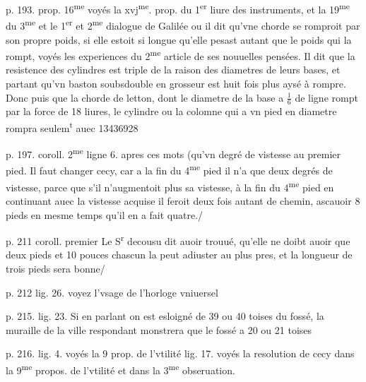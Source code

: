 \documentclass[11pt,a4paper]{article}
\begin{document}
p. 193. prop. 16\textsuperscript{me}
voyés la xvj\textsuperscript{me}. prop. du 1\textsuperscript{er} liure des instruments, et la 19\textsuperscript{me} du 3\textsuperscript{me} et le 1\textsuperscript{er} et 2\textsuperscript{me} dialogue de Galilée ou il dit qu'vne chorde se romproit par son propre poids, si elle estoit si longue qu'elle pesast autant que le poids qui la rompt, voyés les experiences du 2\textsuperscript{me} article de ses nouuelles pensées. Il dit que la resistence des cylindres est triple de la raison des diametres de leurs bases, et partant qu'vn baston soubsdouble en grosseur est huit fois plus aysé à rompre. Donc puis que la chorde de letton, dont le diametre de la base a $\frac{1}{6}$ de ligne rompt par la force de 18 liures, le cylindre ou la colomne qui a \struck{\ill{}} vn pied en diametre rompra seulem\textsuperscript{t} auec 13436928

p. 197. coroll. 2\textsuperscript{me} ligne 6. apres ces mots (qu'vn degré de vistesse au premier pied.
Il faut changer cecy, car a la fin du 4\textsuperscript{me} pied il n'a que deux degrés de vistesse, parce que s'il n'augmentoit plus sa vistesse, à la fin du 4\textsuperscript{me} pied en continuant auec la vistesse acquise il feroit deux fois autant de chemin, ascauoir 8 pieds en mesme temps qu'il en a fait quatre./

p. 211 coroll. premier
Le S\textsuperscript{r} decousu dit auoir trouué, qu'elle ne doibt auoir que deux pieds et 10 pouces chascun la peut adiuster au plus pres, et la longueur de trois pieds sera bonne/


p. 212 lig. 26.
voyez l'vsage de l'horloge vniuersel

p. 215. lig. 23.
Si en parlant on est esloigné de 39 ou 40 toises du fossé, la muraille de la ville respondant monstrera que le fossé a 20 ou 21 toises

p. 216. lig. 4.
voyés la 9 prop. de l'vtilité
 lig. 17. 
voyés la resolution de cecy dans la 9\textsuperscript{me} propos. de l'vtilité et dans la 3\textsuperscript{me} obseruation.
\end{document}
